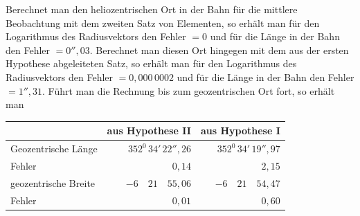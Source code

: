 Berechnet man den heliozentrischen Ort in der Bahn für die mittlere Beobachtung mit dem zweiten Satz von Elementen, so erhält man für den Logarithmus des Radiusvektors den Fehler $=0$ und für die Länge in der Bahn den Fehler $=0''{,}03$. Berechnet man diesen Ort hingegen mit dem aus der ersten Hypothese abgeleiteten Satz, so erhält man für den Logarithmus des Radiusvektors den Fehler $=0{,}000\,0002$ und für die Länge in der Bahn den Fehler $=1''{,}31$. Führt man die Rechnung bis zum geozentrischen Ort fort, so erhält man
\begin{center}
\begingroup\small\setlength{\tabcolsep}{4pt}\renewcommand{\arraystretch}{1.2}
\begin{tabular}{|l|r|r|}\hline
& aus Hypothese II & aus Hypothese I\\\hline
Geozentrische Länge & $352^{0}\,34'\,22''{,}26$ & $352^{0}\,34'\,19''{,}97$\\
Fehler & $0{,}14$ & $2{,}15$\\
geozentrische Breite & $-6\quad21\quad55{,}06$ & $-6\quad21\quad54{,}47$\\
Fehler & $0{,}01$ & $0{,}60$\\\hline
\end{tabular}\endgroup
\end{center}

